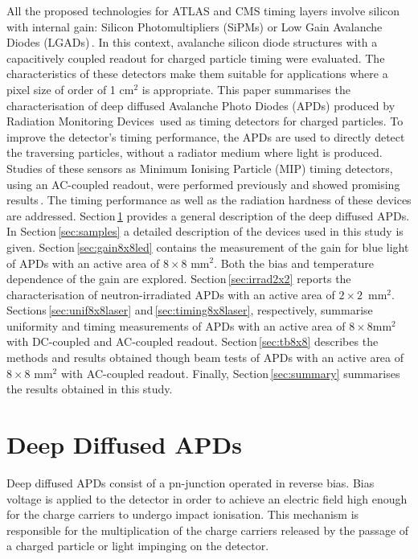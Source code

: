 \documentclass{article}
\begin{document}
All the proposed technologies for ATLAS and CMS timing layers involve silicon with internal gain: Silicon Photomultipliers (SiPMs) or Low Gain Avalanche Diodes (LGADs)\,\cite{cmsMIPtiming,atlasMIPtiming}.
In this context, avalanche silicon diode structures with a capacitively coupled readout for charged particle timing were evaluated.
The characteristics of these detectors make them suitable for applications where a pixel size of order of 1 cm$^{2}$ is appropriate.
This paper summarises the characterisation of deep diffused Avalanche Photo Diodes (APDs) produced by Radiation Monitoring Devices\,\cite{rmdAddress} used as timing detectors for charged particles.
To improve the detector's timing performance, the APDs are used to directly detect the traversing particles, without a radiator medium where light is produced.
Studies of these sensors as Minimum Ionising Particle (MIP) timing detectors, using an AC-coupled readout, were performed previously and showed promising results\,\cite{white2014}.
The timing performance as well as the radiation hardness of these devices are addressed.
Section\,\ref{sec:ddApds} provides a general description of the deep diffused APDs.
In Section\,\ref{sec:samples} a detailed description of the devices used in this study is given.
Section\,\ref{sec:gain8x8led} contains the measurement of the gain for blue light of APDs with an active area of $8 \times 8$ mm$^2$. Both the bias and temperature dependence of the gain are explored.
Section\,\ref{sec:irrad2x2} reports the characterisation of neutron-irradiated APDs with an active area of $2 \times 2$~mm$^2$.
Sections\,\ref{sec:unif8x8laser} and\,\ref{sec:timing8x8laser}, respectively, summarise uniformity and timing measurements of APDs with an active area of $8 \times 8$mm$^2$ with DC-coupled and AC-coupled readout.
Section\,\ref{sec:tb8x8} describes the methods and results obtained though beam tests of APDs with an active area of $8 \times 8$ mm$^2$ with AC-coupled readout.
Finally, Section\,\ref{sec:summary} summarises the results obtained in this study.


\section{Deep Diffused APDs}
\label{sec:ddApds}

Deep diffused APDs consist of a pn-junction operated in reverse bias.
Bias voltage is applied to the detector in order to achieve an electric field high enough for the charge carriers to undergo impact ionisation.
This mechanism is responsible for the multiplication of the charge carriers released by the passage of a charged particle or light impinging on the detector.
\end{document}
